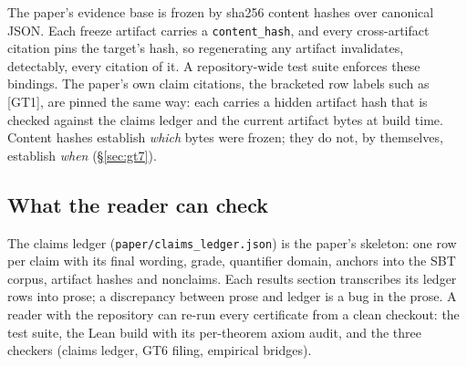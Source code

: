 The paper's evidence base is frozen by sha256 content hashes over canonical JSON. Each freeze
artifact carries a \texttt{content\_hash}, and every cross-artifact citation pins the target's
hash, so regenerating any artifact invalidates, detectably, every citation of it. A
repository-wide test suite enforces these bindings. The paper's own claim citations, the bracketed
row labels such as [GT1], are pinned the same way: each carries a hidden artifact hash that is
checked against the claims ledger and the current artifact bytes at build time. Content hashes
establish \emph{which} bytes were frozen; they do not, by themselves, establish \emph{when}
(\S\ref{sec:gt7}).

\subsection{What the reader can check}

The claims ledger (\texttt{paper/claims\_ledger.json}) is the paper's skeleton: one row per claim
with its final wording, grade, quantifier domain, anchors into the SBT corpus, artifact hashes and
nonclaims. Each results section transcribes its ledger rows into prose; a discrepancy between
prose and ledger is a bug in the prose. A reader with the repository can re-run every certificate
from a clean checkout: the test suite, the Lean build with its per-theorem axiom audit, and the
three checkers (claims ledger, GT6 filing, empirical bridges).
